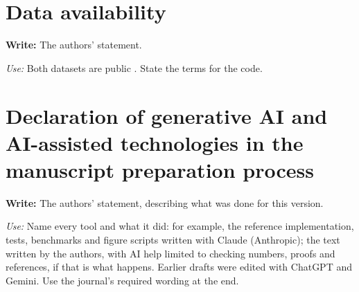 \documentclass[a4paper,fleqn]{cas-sc}
\newif\ifskeleton \skeletontrue          %
\newcommand{\para}[2]{\ifskeleton\begin{parabox}\textbf{Write:} #1
  \par\smallskip\textit{Use:} #2\end{parabox}\fi}
\begin{document}
\section*{Data availability}
\para{The authors' statement.}{Both datasets are public
\citep{stafford_2020_environmental,chen2019beijing}. State the terms for the
code.}

\section*{Declaration of generative AI and AI-assisted technologies in the
manuscript preparation process}
\para{The authors' statement, describing what was done for this version.}{
Name every tool and what it did: for example, the reference implementation,
tests, benchmarks and figure scripts written with Claude (Anthropic); the
text written by the authors, with AI help limited to checking numbers,
proofs and references, if that is what happens. Earlier drafts were edited with
ChatGPT and Gemini. Use the journal's required wording at the end.}



\end{document}
